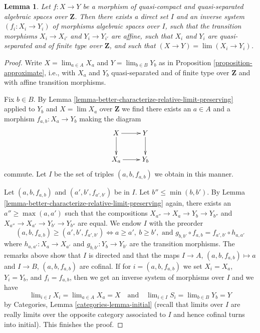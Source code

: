 \documentclass{stacks-project}
\theoremstyle{plain}
\newtheorem{lemma}[subsection]{Lemma}
\theoremstyle{definition}
\theoremstyle{remark}
\numberwithin{equation}{subsection}
\def\lim{\mathop{\mathrm{lim}}\nolimits}
\begin{document}
\begin{lemma}
\label{lemma-approximate-morphism}
Let $f : X \to Y$ be a morphism of quasi-compact and quasi-separated
algebraic spaces over $\mathbf{Z}$.
Then there exists a direct set $I$ and an inverse system $(f_i : X_i \to Y_i)$
of morphisms algebraic spaces over $I$, such that the transition morphisms
$X_i \to X_{i'}$ and $Y_i \to Y_{i'}$ are affine, such that $X_i$
and $Y_i$ are quasi-separated and of finite type over $\mathbf{Z}$, and
such that $(X \to Y) = \lim (X_i \to Y_i)$.
\end{lemma}

\begin{proof}
Write $X = \lim_{a \in A} X_a$ and $Y = \lim_{b \in B} Y_b$ as in
Proposition \ref{proposition-approximate}, i.e., with $X_a$ and $Y_b$
quasi-separated and of finite type over $\mathbf{Z}$ and
with affine transition morphisms.

\medskip\noindent
Fix $b \in B$.
By Lemma \ref{lemma-better-characterize-relative-limit-preserving}
applied to $Y_b$ and $X = \lim X_a$ over $\mathbf{Z}$
we find there exists an $a \in A$ and a morphism
$f_{a, b} : X_a \to Y_b$ making the diagram
$$
\xymatrix{
X \ar[d] \ar[r] & Y \ar[d] \\
X_a \ar[r] & Y_b
}
$$
commute. Let $I$ be the set of triples $(a, b, f_{a, b})$ we
obtain in this manner.

\medskip\noindent
Let $(a, b, f_{a, b})$ and $(a', b', f_{a', b'})$ be in $I$.
Let $b'' \leq \min(b, b')$. By
Lemma \ref{lemma-better-characterize-relative-limit-preserving}
again, there exists an $a'' \geq \max(a, a')$ such that
the compositions $X_{a''} \to X_a \to Y_b \to Y_{b''}$ and
$X_{a''} \to X_{a'} \to Y_{b'} \to Y_{b''}$ are equal.
We endow $I$ with the preorder
$$
(a, b, f_{a, b}) \geq (a', b', f_{a', b'})
\Leftrightarrow
a \geq a',\ b \geq b',\text{ and }
g_{b, b'} \circ f_{a, b} = f_{a', b'} \circ h_{a, a'}
$$
where $h_{a, a'} : X_a \to X_{a'}$ and $g_{b, b'} : Y_b \to Y_{b'}$
are the transition morphisms. The remarks above show that $I$
is directed and that the maps $I \to A$, $(a, b, f_{a, b}) \mapsto a$
and $I \to B$, $(a, b, f_{a, b})$ are cofinal. If for $i = (a, b, f_{a, b})$
we set $X_i = X_a$, $Y_i = Y_b$, and $f_i = f_{a, b}$, then we get
an inverse system of morphisms over $I$ and we have
$$
\lim_{i \in I} X_i = \lim_{a \in A} X_a = X
\quad\text{and}\quad
\lim_{i \in I} S_i = \lim_{b \in B} Y_b = Y
$$
by Categories, Lemma \ref{categories-lemma-initial} (recall that
limits over $I$ are really limits over the opposite category
associated to $I$ and hence cofinal turns into initial).
This finishes the proof.
\end{proof}
\end{document}
